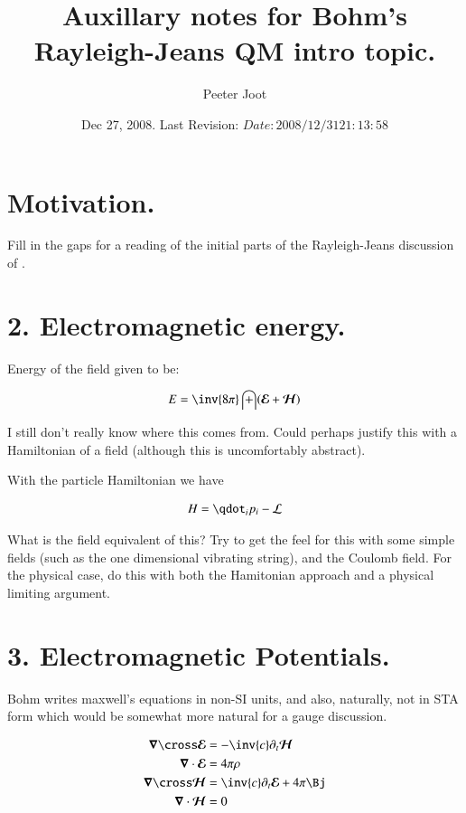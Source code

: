 \documentclass{article}
\title{ Auxillary notes for Bohm's Rayleigh-Jeans QM intro topic. }
\author{Peeter Joot}
\date{ Dec 27, 2008.  Last Revision: $Date: 2008/12/31 21:13:58 $ }
\newcommand{\EE}[0]{\boldsymbol{\mathcal{E}}}
\newcommand{\HH}[0]{\boldsymbol{\mathcal{H}}}
\begin{document}
\maketitle{}


\section{ Motivation. }

Fill in the gaps for a reading of the
initial parts of the Rayleigh-Jeans discussion of \cite{bohm1989qt}.

\section{ 2. Electromagnetic energy. }

Energy of the field given to be:

\begin{align*}
E = \inv{8\pi} \int (\EE + \HH)
\end{align*}

I still don't really know where this comes from.
Could perhaps justify this with a Hamiltonian of a field (although this is
uncomfortably abstract).

With the particle Hamiltonian we have

\begin{align*}
H = \qdot_i p_i -\LL
\end{align*}

What is the field equivalent of this?  Try to get the feel for this with some simple fields (such as the one dimensional vibrating string), and the Coulomb field.  For the physical case, do this with both the Hamitonian approach and a physical limiting argument.

\section{ 3. Electromagnetic Potentials. }

Bohm writes maxwell's equations in non-SI units, and also, naturally, not in STA form which would be somewhat more natural for a gauge
discussion.

\begin{align*}
\spacegrad \cross \EE &= -\inv{c} \partial_t \HH \\
\spacegrad \cdot \EE &= 4 \pi \rho \\
\spacegrad \cross \HH &= \inv{c} \partial_t \EE + 4 \pi \Bj \\
\spacegrad \cdot \HH &= 0
\end{align*}
\end{document}
